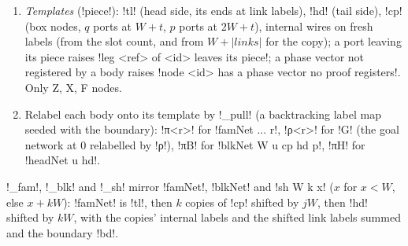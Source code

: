 {{{\begin{algorithm}
\begin{enumerate}
(\lexlean!blkEq!) by \lexpy!_bodies! (\cref{sec:lean-export-chain}); qudit sums or weights raise
\lexcode!the periodic export covers unweighted qubit networks!; several digit counts raise
\lexcode!the periodic export covers one wire dimension!. Equal phase vectors are canonicalized to their
first index in every body line (\lexpy!_canon_phases!).
\item \emph{Templates} (\lexpy!piece!): \lexlean!tl! (head side, its ends at link labels), \lexlean!hd!
(tail side), \lexlean!cp! (box nodes, $q$ ports at $W+t$, $p$ ports at $2W+t$), internal wires on
fresh labels (from the slot count, and from $W + |\mathit{links}|$ for the copy); a port leaving
its piece raises \lexcode!leg <ref> of <id> leaves its piece!; a phase vector not registered by a
body raises \lexcode!node <id> has a phase vector no proof registers!. Only Z, X, F nodes.
\item Relabel each body onto its template by \lexpy!_pull! (a backtracking label map seeded with the
boundary): \lexlean!π<r>! for \lexlean!famNet ... r!, \lexlean!ρ<r>! for \lexlean!G! (the goal network at 0
relabelled by \lexlean!ρ!), \lexlean!πB! for \lexlean!blkNet W u cp hd p!, \lexlean!πH! for
\lexlean!headNet u hd!.
\end{enumerate}
\end{algorithm}
\lexpy!_fam!, \lexpy!_blk! and \lexpy!_sh! mirror \lexlean!famNet!, \lexlean!blkNet! and \lexlean!sh W k x! ($x$
for $x<W$, else $x+kW$): \lexlean!famNet! is \lexlean!tl!, then $k$ copies of \lexlean!cp! shifted by
$jW$, then \lexlean!hd! shifted by $kW$, with the copies' internal labels and the shifted link labels
summed and the boundary \lexlean!bd!.

}}}
